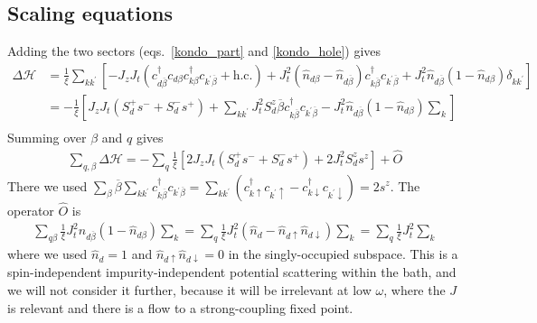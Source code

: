 \documentclass[twoside,11pt]{report}
\numberwithin{equation}{section}
\begin{document}
\subsection{Scaling equations}
Adding the two sectors (eqs.~\ref{kondo_part} and \ref{kondo_hole}) gives
\begin{equation}\begin{aligned}
	\Delta \mathcal{H} &= \frac{1}{\xi}\sum_{kk^\prime} \left[ - J_z J_t\left(c^\dagger_{d\overline\beta}c_{d\beta}c^\dagger_{k\beta}c_{k^\prime\overline\beta} + \text{h.c.}\right) + J_t^2 \left(\hat n_{d\beta} - \hat n_{d\overline\beta}\right) c^\dagger_{k\overline\beta}c_{k^\prime\overline\beta} + J_t^2 \hat n_{d\overline\beta}\left(1 - \hat n_{d\beta}\right) \delta_{kk^\prime}\right]\\
		    &= -\frac{1}{\xi}\left[ J_z J_t\left(S_d^+ s^- + S_d^- s^+\right) + \sum_{kk^\prime} J_t^2 S_d^z \overline\beta c^\dagger_{k\overline\beta}c_{k^\prime\overline\beta} - J_t^2 \hat n_{d\overline\beta}\left(1 - \hat n_{d\beta}\right) \sum_{k} \right]\\
\end{aligned}\end{equation}
Summing over \(\beta\) and \(q\) gives
\begin{equation}\begin{aligned}
	\sum_{q,\beta} \Delta \mathcal{H} = - \sum_q \frac{1}{\xi} \left[2J_z J_t \left( S_d^+ s^- + S_d^- s^+ \right) + 2J_t^2 S_d^z s^z\right] + \hat O
\end{aligned}\end{equation}
There we used \(\sum_\beta \overline\beta \sum_{kk^\prime}c^\dagger_{k\overline\beta}c_{k^\prime\overline\beta} = \sum_{kk^\prime}\left(c^\dagger_{k\uparrow}c_{k^\prime\uparrow} - c^\dagger_{k\downarrow}c_{k^\prime\downarrow}\right)  = 2s^z\). The operator \(\hat O\) is
\begin{equation}\begin{aligned}
	\sum_{q\beta} \frac{1}{\xi} J_t^2 \hat n_{d\overline\beta}\left(1 - \hat n_{d\beta}\right) \sum_{k} = \sum_q \frac{1}{\xi} J_t^2 \left(\hat n_d - \hat n_{d \uparrow} \hat n_{d \downarrow}\right) \sum_k = \sum_q\frac{1}{\xi} J_t^2 \sum_k
\end{aligned}\end{equation}
where we used \(\hat n_d = 1\) and \(\hat n_{d \uparrow} \hat n_{d \downarrow} = 0\) in the singly-occupied subspace. This is a spin-independent impurity-independent potential scattering  within the bath, and we will not consider it further, because it will be irrelevant at low \(\omega\), where the \(J\) is relevant and there is a flow to a strong-coupling fixed point.
\end{document}
